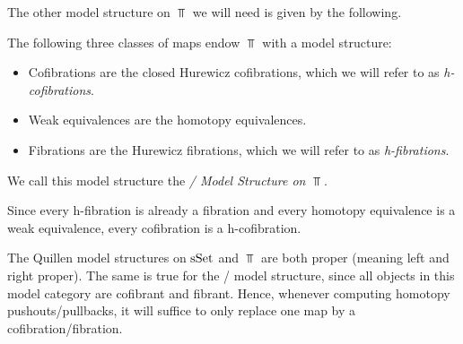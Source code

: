 The other model structure on $\Top$ we will need is given by the following.
\begin{prop}
    The following three classes of maps endow $\Top$ with a model structure:
    \begin{itemize}
        \item Cofibrations are the closed Hurewicz cofibrations, which we will refer to as \emph{h-cofibrations}.
        \item Weak equivalences are the homotopy equivalences.
        \item Fibrations are the Hurewicz fibrations, which we will refer to as \emph{h-fibrations}.
    \end{itemize}
    We call this model structure the \emph{\Strom/ Model Structure on $\Top$}.
    \begin{reference}
       \cite{Strom1972}
    \end{reference}
\end{prop}
\begin{remark}
    Since every h-fibration is already a fibration and every homotopy equivalence is a weak equivalence, every cofibration is a h-cofibration.
\end{remark}
\begin{remark}[Properness]
    The Quillen model structures on $\operatorname{sSet}$ and $\Top$ are both proper (meaning left and right proper).
    The same is true for the \Strom/ model structure, since all objects in this model category are cofibrant and fibrant.
    Hence, whenever computing homotopy pushouts/pullbacks, it will suffice to only replace one map by a cofibration/fibration.
\end{remark}

